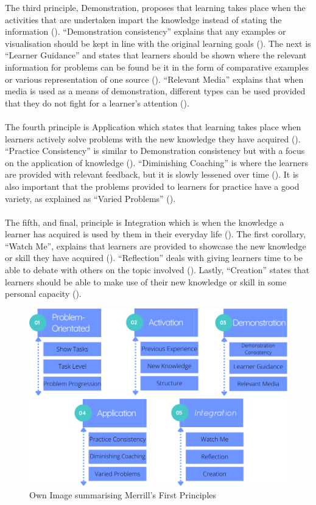 \newpage
The third principle, Demonstration, proposes that learning takes place when the activities that are undertaken impart the knowledge instead of stating the information (\cite{Merrill2002}). “Demonstration consistency” explains that any examples or visualisation should be kept in line with the original learning goals (\cite{Merrill2002}). The next is “Learner Guidance” and states that learners should be shown where the relevant information for problems can be found be it in the form of comparative examples or various representation of one source (\cite{Merrill2002}). “Relevant Media” explains that when media is used as a means of demonstration, different types can be used provided that they do not fight for a learner’s attention (\cite{Merrill2002}).
\\\\
The fourth principle is Application which states that learning takes place when learners actively solve problems with the new knowledge they have acquired (\cite{Merrill2002}). “Practice Consistency” is similar to Demonstration consistency but with a focus on the application of knowledge (\cite{Merrill2002}). “Diminishing Coaching” is where the learners are provided with relevant feedback, but it is slowly lessened over time (\cite{Merrill2002}). It is also important that the problems provided to learners for practice have a good variety, as explained as “Varied Problems” (\cite{Merrill2002}).
\\\\
The fifth, and final, principle is Integration which is when the knowledge a learner has acquired is used by them in their everyday life (\cite{Merrill2002}). The first corollary, “Watch Me”, explains that learners are provided to showcase the new knowledge or skill they have acquired (\cite{Merrill2002}). “Reflection” deals with giving learners time to be able to debate with others on the topic involved (\cite{Merrill2002}). Lastly, “Creation” states that learners should be able to make use of their new knowledge or skill in some personal capacity (\cite{Merrill2002}).


\begin{figure}[H]
\centering
\centerline{\includegraphics[scale=0.5]{Figures/merrill2.png}}
\caption{Own Image summarising Merrill's First Principles}
\end{figure}

